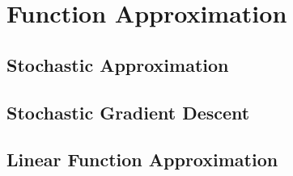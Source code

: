 \section{Function Approximation}

\subsection{Stochastic Approximation}

\subsection{Stochastic Gradient Descent}

\subsection{Linear Function Approximation}
